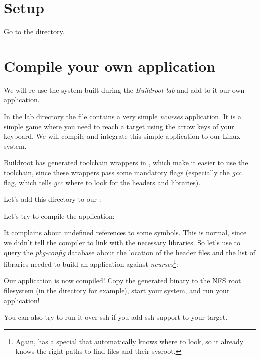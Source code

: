 
\section{Setup}

Go to the  directory.

\section{Compile your own application}

We will re-use the system built during the {\em Buildroot lab} and add
to it our own application.

In the lab directory the file  contains a very simple
{\em ncurses} application. It is a simple game where you need to reach
a target using the arrow keys of your keyboard.  We will compile and
integrate this simple application to our Linux system.

Buildroot has generated toolchain wrappers in
, which make it easier to use the toolchain,
since these wrappers pass some mandatory flags (especially the
 {\em gcc} flag, which tells {\em gcc} where to look
for the headers and libraries).

Let's add this directory to our :

\normalsize

Let's try to compile the application:


It complains about undefined references to some symbols. This is
normal, since we didn't tell the compiler to link with the necessary
libraries. So let's use  to query the {\em
pkg-config} database about the location of the header files and the
list of libraries needed to build an application against
{\em ncurses}\footnote{Again,  has a special
 that automatically knows where to look, so it
already knows the right paths to find  files and their
sysroot.}:


Our application is now compiled! Copy the generated binary to the NFS
root filesystem (in the  directory for example), start
your system, and run your application!

You can also try to run it over ssh if you add ssh support to your
target.
